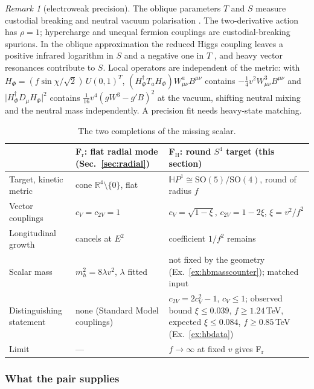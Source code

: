 \documentclass[aps,pra,onecolumn,superscriptaddress,nofootinbib,10pt]{revtex4-2}
\theoremstyle{definition}
\theoremstyle{remark}
\newtheorem{remark}[theorem]{Remark}
\newcommand{\R}{\mathbb{R}}
\newcommand{\HH}{\mathbb{H}}
\newcommand{\SO}{\mathrm{SO}}
\begin{document}
\begin{remark}[electroweak precision]\label{rem:hbprecision}
The oblique parameters $T$ and $S$ \cite{n7:PT} measure custodial breaking and neutral vacuum polarisation
\cite[Sec.~10.6, Eq.~(10.84), Table~10.8 of the electroweak review]{ex-PDG26}.  The two-derivative action has $\rho=1$;
hypercharge and unequal fermion couplings are custodial-breaking spurions.  In the oblique
approximation the reduced Higgs coupling leaves a positive infrared logarithm in $S$ and a negative one in $T$
\cite{n7:BBRV,n7:PW}, and heavy vector resonances contribute to $S$.  Local operators are independent of the
metric: with $H_\Phi=(f\sin\chi/\sqrt2)\,U(0,1)^T$, $(H_\Phi^\dagger T_aH_\Phi)W^a_{\mu\nu}B^{\mu\nu}$ contains $-\tfrac14v^2W^3_{\mu\nu}B^{\mu\nu}$ and $\lvert H_\Phi^\dagger D_\mu H_\Phi\rvert^2$
contains $\tfrac1{16}v^4(gW^3-g'B)^2$ at the vacuum, shifting neutral mixing and the neutral mass independently.  A
precision fit needs heavy-state matching.
\end{remark}

\begin{table}[h]
\caption{The two completions of the missing scalar.}\label{tab:twoscalars}
\footnotesize
\begin{tabular}{@{}p{}p{}p{}@{}}
\toprule
& F$_{\mathrm r}$: flat radial mode (Sec.~\ref{sec:radial}) & F$_{\mathrm H}$: round $S^4$ target (this section)\\
\midrule
Target, kinetic metric & cone $\R^4\setminus\{0\}$, flat & $\HH P^1\cong\SO(5)/\SO(4)$, round of radius $f$\\
Vector couplings & $c_V=c_{2V}=1$ & $c_V=\sqrt{1-\xi}$, $c_{2V}=1-2\xi$, $\xi=v^2/f^2$\\
Longitudinal growth & cancels at $E^2$ & coefficient $1/f^2$ remains\\
Scalar mass & $m_h^2=8\lambda v^2$, $\lambda$ fitted & not fixed by the geometry (Ex.~\ref{ex:hbmasscounter}); matched input\\
Distinguishing statement & none (Standard Model couplings) & $c_{2V}=2c_V^2-1$, $c_V\le1$; observed bound $\xi\le0.039$, $f\ge1.24$\,TeV, expected $\xi\le0.084$, $f\ge0.85$\,TeV (Ex.~\ref{ex:hbdata})\\
Limit & --- & $f\to\infty$ at fixed $v$ gives F$_{\mathrm r}$\\
\bottomrule
\end{tabular}
\end{table}

\subsubsection{What the pair supplies}
\end{document}
